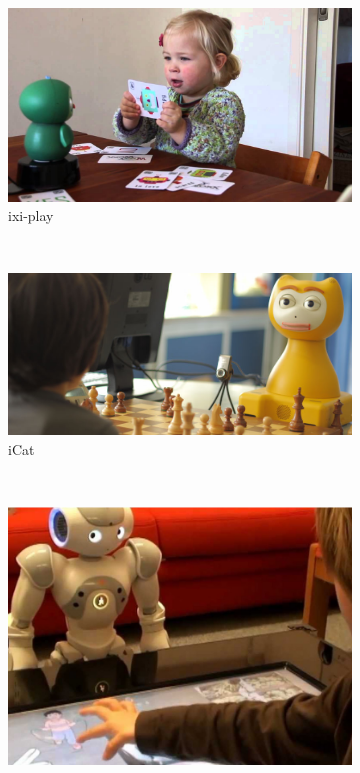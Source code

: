 \begin{figure}[h!]
        \centering
        \begin{subfigure}[b]{0.4\textwidth}
                \includegraphics[width=\textwidth]{figures/int1.jpg}
                \caption{ixi-play}
                \label{fig:int1}
        \end{subfigure}%
        ~ %
        \begin{subfigure}[b]{0.475\textwidth}
                \includegraphics[width=\textwidth]{figures/int2.jpg}
                \caption{iCat}
                \label{fig:int2}
        \end{subfigure}
        ~ %
        \begin{subfigure}[b]{0.3\textwidth}
                \includegraphics[width=\textwidth]{figures/int3.jpg}

\end{subfigure}
\end{figure}
